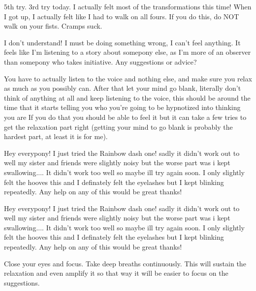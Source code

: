 \documentclass[ebook,12pt,oneside,openany]{memoir}
\begin{document}
\begin{tcolorbox}[title=Shining Wing,colback=blue!5!white,colframe=blue!75!black,coltitle=white]
\par{5th try. 3rd try today. I actually felt most of the transformations this time! When I got up, I actually felt like I had to walk on all fours. If you do this, do NOT walk on your fists. Cramps suck.}
\end{tcolorbox}
\begin{tcolorbox}[title=GoldenShield]
\begin{tcolorbox}[title=Opalicious]
\par{I don't understand! I must be doing something wrong, I can't feel anything. It feels like I'm listening to a story about somepony else, as I'm more of an observer than somepony who takes initiative. Any suggestions or advice?}
\end{tcolorbox}
\par{You have to actually listen to the voice and nothing else, and make sure you relax as much as you possibly can. After that let your mind go blank, literally don't think of anything at all and keep listening to the voice, this should be around the time that it starts telling you who you're going to be hypnotized into thinking you are If you do that you should be able to feel it but it can take a few tries to get the relaxation part right (getting your mind to go blank is probably the hardest part, at least it is for me).}
\end{tcolorbox}
\begin{tcolorbox}[title=Sanic Screwdriver]
\par{Hey everypony! I just tried the Rainbow dash one! sadly it didn't work out to well my sister and friends were slightly noisy but the worse part was i kept swallowing.... It didn't work too well so maybe ill try again soon. I only slightly felt the hooves this and I definately felt the eyelashes but I kept blinking repeatedly. Any help on any of this would be great thanks!}
\end{tcolorbox}
\begin{tcolorbox}[title=C. Thunder Dash,colback=orange!5!white,colframe=orange!75!black,coltitle=white]
\begin{tcolorbox}[title=pokesonicfan11]
\par{Hey everypony! I just tried the Rainbow dash one! sadly it didn't work out to well my sister and friends were slightly noisy but the worse part was i kept swallowing.... It didn't work too well so maybe ill try again soon. I only slightly felt the hooves this and I definately felt the eyelashes but I kept blinking repeatedly. Any help on any of this would be great thanks!}
\end{tcolorbox}
\par{Close your eyes and focus. Take deep breaths continuously. This will sustain the relaxation and even amplify it so that way it will be easier to focus on the suggestions. }
\end{tcolorbox}
\end{document}
